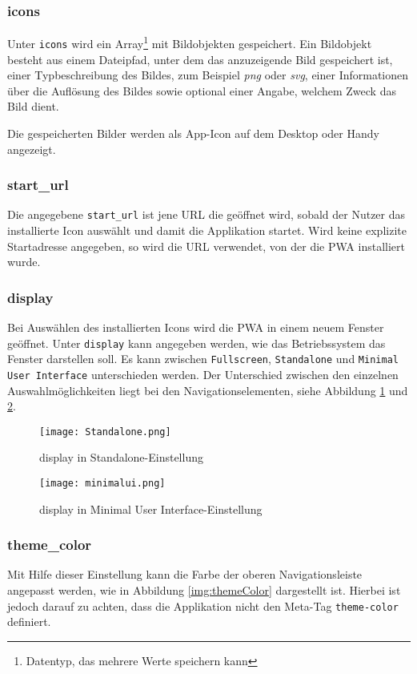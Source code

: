 \subsubsection{icons}
Unter \texttt{icons} wird ein Array\footnote{Datentyp, das mehrere Werte speichern kann} mit Bildobjekten gespeichert. Ein Bildobjekt besteht aus einem Dateipfad, unter dem das anzuzeigende Bild gespeichert ist, einer Typbeschreibung des Bildes, zum Beispiel \textit{png} oder \textit{svg}, einer Informationen über die Auflösung des Bildes sowie optional einer Angabe, welchem Zweck das Bild dient. 

Die gespeicherten Bilder werden als App-Icon auf dem Desktop oder Handy angezeigt. 

\subsubsection{start\_url}
Die angegebene \texttt{start\_url} ist jene \ac{URL} die geöffnet wird, sobald der Nutzer das installierte Icon auswählt und damit die Applikation startet. 
Wird keine explizite Startadresse angegeben, so wird die URL verwendet, von der die PWA installiert wurde. 

\subsubsection{display}

Bei Auswählen des installierten Icons wird die PWA in einem neuem Fenster geöffnet. Unter \texttt{display} kann angegeben werden, wie das Betriebssystem das Fenster darstellen soll. 
Es kann zwischen \texttt{Fullscreen}, \texttt{Standalone} und \texttt{Minimal User Interface} unterschieden werden. 
Der Unterschied zwischen den einzelnen Auswahlmöglichkeiten liegt bei den Navigationselementen, siehe Abbildung \ref{img:Standalone} und \ref{img:minimalui}.

\begin{figure}[!htb]
    \texttt{[image: Standalone.png]}
    \caption{display in \glqq Standalone\grqq{}-Einstellung}
    \label{img:Standalone}
\end{figure}


\begin{figure}[!htb]
    \texttt{[image: minimalui.png]}
    \caption{display in \glqq Minimal User Interface\grqq{}-Einstellung}
    \label{img:minimalui}
\end{figure}

\subsubsection{theme\_color}
Mit Hilfe dieser Einstellung kann die Farbe der oberen Navigationsleiste angepasst werden, wie in Abbildung \ref{img:themeColor} dargestellt ist. Hierbei ist jedoch darauf zu achten, dass die Applikation nicht den Meta-Tag \texttt{theme-color} definiert. 

